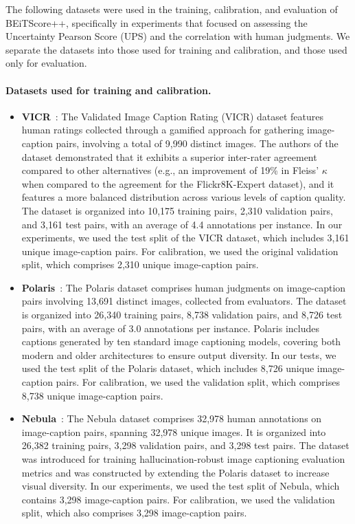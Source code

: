 \documentclass[11pt]{article}
\begin{document}
The following datasets were used in the training, calibration, and evaluation of BEiTScore++, specifically in experiments that focused on assessing the Uncertainty Pearson Score (UPS) and the correlation with human judgments. We separate the datasets into those used for training and calibration, and those used only for evaluation.

\paragraph{Datasets used for training and calibration.}
\begin{itemize}\setlength\itemsep{0em}
\item \textbf{VICR}~\cite{narins2023validated}:
The Validated Image Caption Rating (VICR) dataset features human ratings collected through a gamified approach for gathering image-caption pairs, involving a total of 9,990 distinct images. The authors of the dataset demonstrated that it exhibits a superior inter-rater agreement compared to other alternatives (e.g., an improvement of 19\% in Fleiss' $\kappa$ when compared to the agreement for the Flickr8K-Expert dataset), and it features a more balanced distribution across various levels of caption quality. The dataset is organized into 10,175 training pairs, 2,310 validation pairs, and 3,161 test pairs, with an average of 4.4 annotations per instance. In our experiments, we used the test split of the VICR dataset, which includes 3,161 unique image-caption pairs. For calibration, we used the original validation split, which comprises 2,310 unique image-caption pairs.
\item \textbf{Polaris}~\cite{wada2024polos}:
The Polaris dataset comprises human judgments on image-caption pairs involving 13,691 distinct images, collected from evaluators. The dataset is organized into 26,340 training pairs, 8,738 validation pairs, and 8,726 test pairs, with an average of 3.0 annotations per instance. Polaris includes captions generated by ten standard image captioning models, covering both modern and older architectures to ensure output diversity. In our tests, we used the test split of the Polaris dataset, which includes 8,726 unique image-caption pairs. For calibration, we used the validation split, which comprises 8,738 unique image-caption pairs.
\item \textbf{Nebula}~\cite{matsuda2024deneb}:
The Nebula dataset comprises 32,978 human annotations on image-caption pairs, spanning 32,978 unique images. It is organized into 26,382 training pairs, 3,298 validation pairs, and 3,298 test pairs. The dataset was introduced for training hallucination-robust image captioning evaluation metrics and was constructed by extending the Polaris dataset to increase visual diversity. In our experiments, we used the test split of Nebula, which contains 3,298 image-caption pairs. For calibration, we used the validation split, which also comprises 3,298 image-caption pairs.

\end{itemize}
\end{document}
